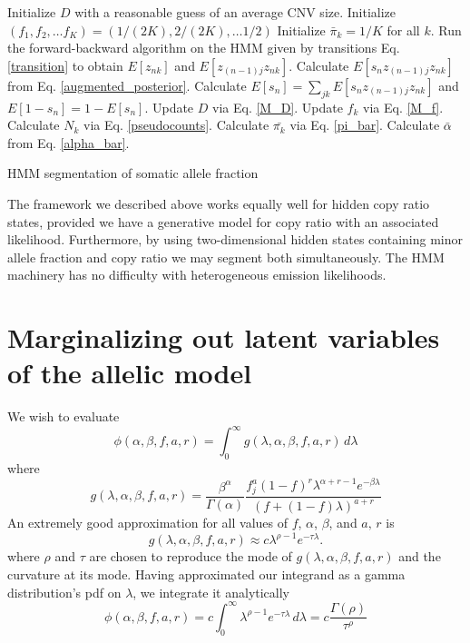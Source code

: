 \documentclass[nofootinbib,amssymb,amsmath]{revtex4}
\begin{document}
 \begin{algorithm}
\begin{algorithmic}[1]
\State Initialize $D$ with a reasonable guess of an average CNV size.
\State Initialize $(f_1, f_2, \ldots f_K) = (1/(2K), 2/(2K), \ldots 1/2)$
\State Initialize $\bar{\pi}_k = 1/K$ for all $k$.
\Repeat
	\State Run the forward-backward algorithm on the HMM given by transitions Eq. \ref{transition} to obtain $E[z_{nk}]$ and $E[z_{(n-1)j} z_{nk}]$.
	\State Calculate $E \left[s_n  z_{(n-1)j} z_{nk} \right]$ from Eq. \ref{augmented_posterior}.
	\State Calculate $E[s_n] = \sum_{jk} E \left[s_n  z_{(n-1)j} z_{nk} \right]$ and $E[1-s_n] = 1 - E[s_n]$.
	\State Update $D$ via Eq. \ref{M_D}.
	\State Update $f_k$ via Eq. \ref{M_f}.
	\State Calculate $N_k$ via Eq. \ref{pseudocounts}.
	\State Calculate $\bar{\pi_k}$ via Eq. \ref{pi_bar}.
	\State Calculate $\bar{\alpha}$ from Eq. \ref{alpha_bar}.
\end{algorithmic}
\caption{HMM segmentation of somatic allele fraction}
\label{HMM}
\end{algorithm}

The framework we described above works equally well for hidden copy ratio states, provided we have a generative model for copy ratio with an associated likelihood.  Furthermore, by using two-dimensional hidden states containing minor allele fraction and copy ratio we may segment both simultaneously.  The HMM machinery has no difficulty with heterogeneous emission likelihoods.

\appendix

\section{Marginalizing out latent variables of the allelic model} \label{marginalizing}
We wish to evaluate
%
\begin{equation}
\phi(\alpha, \beta, f, a, r) = \int_0^\infty g(\lambda, \alpha, \beta, f, a, r) \, d \lambda 
\end{equation}
%
where
%
\begin{equation}
g(\lambda, \alpha, \beta, f, a, r) =  \frac{\beta^\alpha}{\Gamma(\alpha)}  \frac{ f_j^{a} (1 - f)^{r}  \lambda^{\alpha + r - 1} e^{-\beta \lambda}}{ \left( f + (1-f) \lambda \right)^{a+r}} 
\end{equation}
%
An extremely good approximation for all values of $f$, $\alpha$, $\beta$, and $a, \, r$ is
\begin{equation}
g(\lambda, \alpha, \beta, f, a, r) \approx c \lambda^{\rho - 1} e^{-\tau \lambda}.
\end{equation}
where $\rho$ and $\tau$ are chosen to reproduce the mode of $g(\lambda, \alpha, \beta, f, a, r)$ and the curvature at its mode.  Having approximated our integrand as a gamma distribution's pdf on $\lambda$, we integrate it analytically
%
\begin{equation}
\phi(\alpha, \beta, f, a, r) = c \int_0^\infty \lambda^{\rho - 1} e^{-\tau \lambda} \, d \lambda = c \frac{\Gamma(\rho)}{\tau^\rho}
\end{equation}
%
\end{document}
